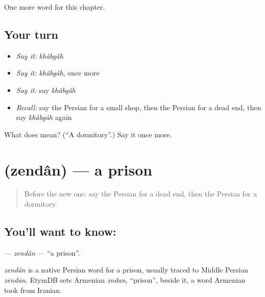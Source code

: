 \begin{grammarlens}[title={What you've built}]
One more word for this chapter.
\end{grammarlens}

\subsection*{Your turn}
\begin{itemize}
\raggedright
  \item \emph{Say it:} \emph{khâbgâh}
  \item \emph{Say it:} \emph{khâbgâh}, once more
  \item \emph{Say it:} say \emph{khâbgâh}
  \item \emph{Recall:} say the Persian for a small shop, then the Persian for a dead end, then say \emph{khâbgâh} again
\end{itemize}

\begin{tcolorbox}[breakable,colback=teal!4,colframe=teal!35!black,title={Before you move on}]
What does  mean? (\textquotedblleft{}A dormitory\textquotedblright{}.) Say it once more.
\end{tcolorbox}
\section[\texorpdfstring{\fa{زندان} (zendân)}{زندان (zendân)}]{ (zendân) — a prison}

\label{lesson:FA-C157-zendan}



\begin{quote}
Before the new one: say the Persian for a dead end, then the Persian for a dormitory.
\end{quote}

\subsection*{You'll want to know: }
\textbf{} — \emph{zendân} — \textquotedblleft{}a prison\textquotedblright{}.

\begin{cousinweb}
\emph{zendân} is a native Persian word for a prison, usually traced to Middle Persian \emph{zēndān}. EtymDB sets Armenian \emph{zndan}, \textquotedblleft{}prison\textquotedblright{}, beside it, a word Armenian took from Iranian.
\end{cousinweb}

